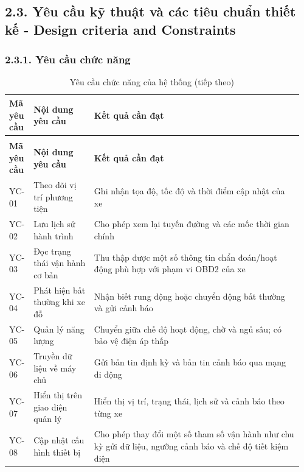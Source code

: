 \documentclass[a4paper]{extarticle}
\newcommand{\thesissettableid}[2]{%
  \renewcommand{\thetable}{#1}%
  \renewcommand{\theHtable}{#2}%
}
\begin{document}
\subsection{2.3. Yêu cầu kỹ thuật và các tiêu chuẩn thiết kế - Design criteria and Constraints}\label{yuxeau-cux1ea7u-kux1ef9-thuux1eadt-vuxe0-cuxe1c-tiuxeau-chuux1ea9n-thiux1ebft-kux1ebf---design-criteria-and-constraints}

\subsubsection{2.3.1. Yêu cầu chức năng}\label{yuxeau-cux1ea7u-chux1ee9c-nux103ng}

{\thesissettableid{2.3}{condensed-bang-2-3-yeu-cau-chuc-nang-cua-he-thong}
\def\LTcaptype{table}
\begin{longtable}{|L{0.068\linewidth}|L{0.2\linewidth}|L{0.69\linewidth}|}
\caption{Yêu cầu chức năng của hệ thống}\label{tab:condensed-bang-2-3-yeu-cau-chuc-nang-cua-he-thong}\\
\hline
\textbf{Mã yêu cầu} & \textbf{Nội dung yêu cầu} & \textbf{Kết quả cần đạt} \\
\hline
\endfirsthead
\caption[]{Yêu cầu chức năng của hệ thống (tiếp theo)}\\
\hline
\textbf{Mã yêu cầu} & \textbf{Nội dung yêu cầu} & \textbf{Kết quả cần đạt} \\
\hline
\endhead
\endfoot
\endlastfoot
YC-01 & Theo dõi vị trí phương tiện & Ghi nhận tọa độ, tốc độ và thời điểm cập nhật của xe \\\hline
YC-02 & Lưu lịch sử hành trình & Cho phép xem lại tuyến đường và các mốc thời gian chính \\\hline
YC-03 & Đọc trạng thái vận hành cơ bản & Thu thập được một số thông tin chẩn đoán/hoạt động phù hợp với phạm vi OBD2 của xe \\\hline
YC-04 & Phát hiện bất thường khi xe đỗ & Nhận biết rung động hoặc chuyển động bất thường và gửi cảnh báo \\\hline
YC-05 & Quản lý năng lượng & Chuyển giữa chế độ hoạt động, chờ và ngủ sâu; có bảo vệ điện áp thấp \\\hline
YC-06 & Truyền dữ liệu về máy chủ & Gửi bản tin định kỳ và bản tin cảnh báo qua mạng di động \\\hline
YC-07 & Hiển thị trên giao diện quản lý & Hiển thị vị trí, trạng thái, lịch sử và cảnh báo theo từng xe \\\hline
YC-08 & Cập nhật cấu hình thiết bị & Cho phép thay đổi một số tham số vận hành như chu kỳ gửi dữ liệu, ngưỡng cảnh báo và chế độ tiết kiệm điện \\\hline
\end{longtable}
}
\end{document}
